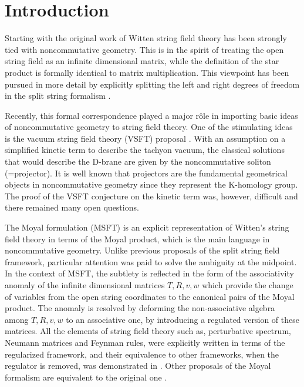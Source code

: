 \documentclass[a4paper,aps,preprint,nofootinbib,eqsecnum]{revtex4}
\begin{document}
\section{Introduction}


{}Starting with the original work of Witten \cite{Witten} string field
theory has been strongly tied with noncommutative geometry. This is in the
spirit of treating the open string field as an infinite dimensional matrix,
while the definition of the star product is formally identical to matrix
multiplication. This viewpoint has been pursued in more detail by explicitly
splitting the left and right degrees of freedom in the split string
formalism \cite{splitSFT}.

Recently, this formal correspondence played a major r\^{o}le in importing
basic ideas of noncommutative geometry to string field theory. One of the
stimulating ideas is the vacuum string field theory (VSFT) proposal \cite%
{VSFT}. With an assumption on a simplified kinetic term to describe the
tachyon vacuum, the classical solutions that would describe the D-brane are
given by the noncommutative soliton \cite{GMS} (=projector). It is well
known that projectors are the fundamental geometrical objects in
noncommutative geometry since they represent the K-homology group. The proof
of the VSFT conjecture on the kinetic term was, however, difficult and there
remained many open questions.

The Moyal formulation \cite{B}\cite{BM1}\cite{BM2}\cite{BKM1}\cite{B2}
(MSFT) is an explicit representation of Witten's string field theory in
terms of the Moyal product, which is the main language in noncommutative
geometry. Unlike previous proposals of the split string field framework,
particular attention was paid to solve the ambiguity at the midpoint. In the
context of MSFT, the subtlety is reflected in the form of the associativity
anomaly \cite{BM1} of the infinite dimensional matrices $T,R,v,w$ which
provide the change of variables from the open string coordinates to the
canonical pairs of the Moyal product. The anomaly is resolved by deforming
the non-associative algebra among $T,R,v,w$ to an associative one, by
introducing a regulated version of these matrices. All the elements of
string field theory such as, perturbative spectrum, Neumann matrices and
Feynman rules, were explicitly written in terms of the regularized
framework, and their equivalence to other frameworks, when the regulator is
removed, was demonstrated in \cite{BM2}\cite{BKM1}. Other proposals of the
Moyal formalism \cite{DLMZ}\cite{Moyal} are equivalent to the original one
\cite{B2}.
\end{document}
